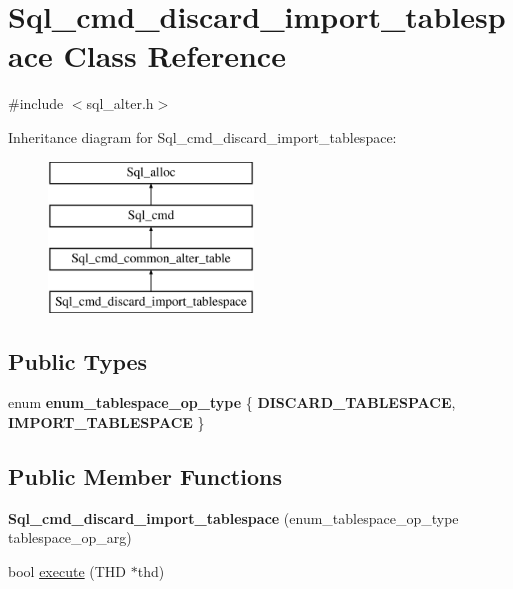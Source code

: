 \hypertarget{classSql__cmd__discard__import__tablespace}{}\section{Sql\+\_\+cmd\+\_\+discard\+\_\+import\+\_\+tablespace Class Reference}
\label{classSql__cmd__discard__import__tablespace}


{\ttfamily \#include $<$sql\+\_\+alter.\+h$>$}

Inheritance diagram for Sql\+\_\+cmd\+\_\+discard\+\_\+import\+\_\+tablespace\+:\begin{figure}[H]
\begin{center}
\leavevmode
\includegraphics[height=4.000000cm]{classSql__cmd__discard__import__tablespace}
\end{center}
\end{figure}
\subsection*{Public Types}
\begin{DoxyCompactItemize}
\item 
\mbox{\label{classSql__cmd__discard__import__tablespace_a7764e039f4863843f13f091f452c845a}} 
enum {\bfseries enum\+\_\+tablespace\+\_\+op\+\_\+type} \{ {\bfseries D\+I\+S\+C\+A\+R\+D\+\_\+\+T\+A\+B\+L\+E\+S\+P\+A\+CE}, 
{\bfseries I\+M\+P\+O\+R\+T\+\_\+\+T\+A\+B\+L\+E\+S\+P\+A\+CE}
 \}
\end{DoxyCompactItemize}
\subsection*{Public Member Functions}
\begin{DoxyCompactItemize}
\item 
\mbox{\label{classSql__cmd__discard__import__tablespace_af12fb020818b1740662c577394448754}} 
{\bfseries Sql\+\_\+cmd\+\_\+discard\+\_\+import\+\_\+tablespace} (enum\+\_\+tablespace\+\_\+op\+\_\+type tablespace\+\_\+op\+\_\+arg)
\item 
bool \mbox{\hyperlink{classSql__cmd__discard__import__tablespace_a6a9f29aed00bc40b029e159b515d847d}{execute}} (T\+HD $\ast$thd)
\end{DoxyCompactItemize}

